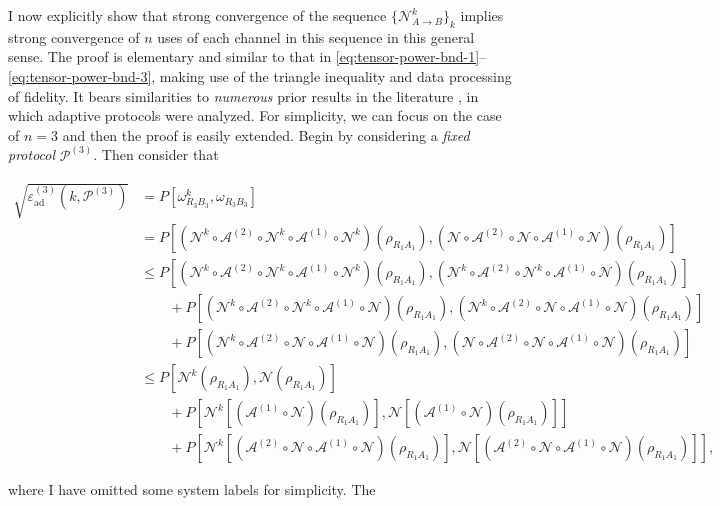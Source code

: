 \documentclass[apsrev,twocolumn]{revtex4-1}%
\begin{document}
I now explicitly show that strong convergence of the sequence $\{\mathcal{N}%
_{A\rightarrow B}^{k}\}_{k}$ implies strong convergence of $n$ uses of each
channel in this sequence in this general sense. The proof is elementary and
similar to that in
\eqref{eq:tensor-power-bnd-1}--\eqref{eq:tensor-power-bnd-3}, making use of
the triangle inequality and data processing of fidelity. It bears similarities
to \textit{numerous} prior results in the literature
\cite{BBBV97,BBHT98,Z99,BHLS03,CMW14,TGW14,TGW14Nat,Christandl2017}, in which
adaptive protocols were analyzed. For simplicity, we can focus on the case of
$n=3$ and then the proof is easily extended. Begin by considering a
\textit{fixed protocol} $\mathcal{P}^{(3)}$. Then consider
that\begin{widetext}%
\begin{align}
\sqrt{\varepsilon_{\text{ad}}^{(3)}(k,\mathcal{P}^{(3)})} &  =P\left[
\omega_{R_{3}B_{3}}^{k},\omega_{R_{3}B_{3}}\right]  \nonumber\\
&  =P\left[  \left(  \mathcal{N}^{k}\circ\mathcal{A}^{(2)}\circ\mathcal{N}%
^{k}\circ\mathcal{A}^{(1)}\circ\mathcal{N}^{k}\right)  (\rho_{R_{1}A_{1}%
}),\left(  \mathcal{N}\circ\mathcal{A}^{(2)}\circ\mathcal{N}\circ
\mathcal{A}^{(1)}\circ\mathcal{N}\right)  (\rho_{R_{1}A_{1}})\right]
\nonumber\\
&  \leq P\left[  \left(  \mathcal{N}^{k}\circ\mathcal{A}^{(2)}\circ
\mathcal{N}^{k}\circ\mathcal{A}^{(1)}\circ\mathcal{N}^{k}\right)  (\rho
_{R_{1}A_{1}}),\left(  \mathcal{N}^{k}\circ\mathcal{A}^{(2)}\circ
\mathcal{N}^{k}\circ\mathcal{A}^{(1)}\circ\mathcal{N}\right)  (\rho
_{R_{1}A_{1}})\right]  \nonumber\\
&  \qquad+P\left[  \left(  \mathcal{N}^{k}\circ\mathcal{A}^{(2)}%
\circ\mathcal{N}^{k}\circ\mathcal{A}^{(1)}\circ\mathcal{N}\right)
(\rho_{R_{1}A_{1}}),\left(  \mathcal{N}^{k}\circ\mathcal{A}^{(2)}%
\circ\mathcal{N}\circ\mathcal{A}^{(1)}\circ\mathcal{N}\right)  (\rho
_{R_{1}A_{1}})\right]  \nonumber\\
&  \qquad+P\left[  \left(  \mathcal{N}^{k}\circ\mathcal{A}^{(2)}%
\circ\mathcal{N}\circ\mathcal{A}^{(1)}\circ\mathcal{N}\right)  (\rho
_{R_{1}A_{1}}),\left(  \mathcal{N}\circ\mathcal{A}^{(2)}\circ\mathcal{N}%
\circ\mathcal{A}^{(1)}\circ\mathcal{N}\right)  (\rho_{R_{1}A_{1}})\right]
\nonumber\\
&  \leq P\left[  \mathcal{N}^{k}(\rho_{R_{1}A_{1}}),\mathcal{N}(\rho
_{R_{1}A_{1}})\right]  \nonumber\\
&  \qquad+P\left[  \mathcal{N}^{k}\left[  (\mathcal{A}^{(1)}\circ
\mathcal{N})(\rho_{R_{1}A_{1}})\right]  ,\mathcal{N}\left[  (\mathcal{A}%
^{(1)}\circ\mathcal{N})(\rho_{R_{1}A_{1}})\right]  \right]  \nonumber\\
&  \qquad+P\left[  \mathcal{N}^{k}\left[  (\mathcal{A}^{(2)}\circ
\mathcal{N}\circ\mathcal{A}^{(1)}\circ\mathcal{N})(\rho_{R_{1}A_{1}})\right]
,\mathcal{N}\left[  (\mathcal{A}^{(2)}\circ\mathcal{N}\circ\mathcal{A}%
^{(1)}\circ\mathcal{N})(\rho_{R_{1}A_{1}})\right]  \right]
,\label{eq:adap-err-dist}%
\end{align}
\end{widetext}where I have omitted some system labels for simplicity. The
\end{document}
